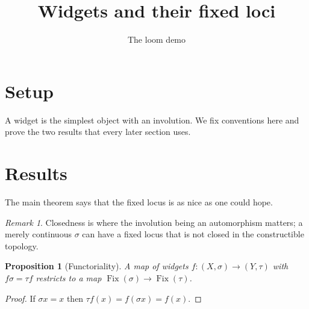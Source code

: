 \documentclass{amsart}
\title{Widgets and their fixed loci}
\author{The loom demo}
\theoremstyle{plain}
\newtheorem{proposition}[theorem]{Proposition}
\theoremstyle{definition}
\theoremstyle{remark}
\newtheorem{remark}[theorem]{Remark}
\newcommand{\Fix}{\operatorname{Fix}}
\begin{document}
\maketitle

\section{Setup}\label{dm-0010}

A widget is the simplest object with an involution. We fix conventions here and prove the two results that every later section uses.





\section{Results}\label{dm-0011}

The main theorem says that the fixed locus is as nice as one could hope.



\begin{remark}\label{dm-0004}
Closedness is where the involution being an automorphism matters; a merely continuous $\sigma$ can have a fixed locus that is not closed in the constructible topology.
\end{remark}

\begin{proposition}[Functoriality]\label{dm-0005}
A map of widgets $f\colon (X,\sigma)\to(Y,\tau)$ with $f\sigma = \tau f$ restricts to a map $\Fix(\sigma)\to\Fix(\tau)$.
\end{proposition}
\begin{proof}
If $\sigma x = x$ then $\tau f(x) = f(\sigma x) = f(x)$. 
\end{proof}



\end{document}
